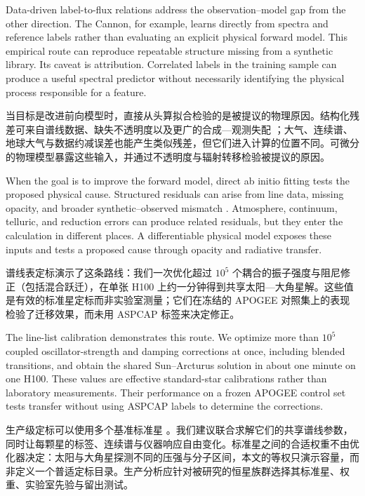 \begin{EN}
Data-driven label-to-flux relations address the observation--model gap from the
other direction. The Cannon, for example, learns directly from spectra and
reference labels rather than evaluating an explicit physical forward model.
This empirical route can reproduce repeatable structure missing from a
synthetic library. Its caveat is attribution. Correlated labels
in the training sample can produce a useful spectral predictor without
necessarily identifying the physical process responsible for a feature.
\end{EN}

当目标是改进前向模型时，直接从头算拟合检验的是被提议的物理原因。结构化残差可来自谱线数据、缺失不透明度以及更广的合成—观测失配 \citep{Czekala2015,OBriain2021}；大气、连续谱、地球大气与数据约减误差也能产生类似残差，但它们进入计算的位置不同。可微分的物理模型暴露这些输入，并通过不透明度与辐射转移检验被提议的原因。

\begin{EN}
When the goal is to improve the forward model, direct ab initio fitting tests
the proposed physical cause. Structured residuals can arise from line data,
missing opacity, and broader synthetic--observed mismatch
\citep{Czekala2015,OBriain2021}. Atmosphere, continuum, telluric, and reduction
errors can produce related residuals, but they enter the calculation in
different places. A
differentiable physical model exposes these inputs and tests a proposed cause
through opacity and radiative transfer.
\end{EN}

谱线表定标演示了这条路线：我们一次优化超过 $10^5$ 个耦合的振子强度与阻尼修正（包括混合跃迁），在单张 H100 上约一分钟得到共享太阳—大角星解。这些值是有效的标准星定标而非实验室测量；它们在冻结的 APOGEE 对照集上的表现检验了迁移效果，而未用 ASPCAP 标签来决定修正。

\begin{EN}
The line-list calibration demonstrates this route. We optimize more than
$10^5$ coupled oscillator-strength and damping corrections at once, including
blended transitions, and obtain the shared Sun--Arcturus solution in about one
minute on one H100. These values are effective standard-star calibrations rather
than laboratory measurements. Their performance on a frozen APOGEE control set
tests transfer without using ASPCAP labels to determine the corrections.
\end{EN}

生产级定标可以使用多个基准标准星 \citep{Heiter2015,Jofre2015,Smith2021}。我们建议联合求解它们的共享谱线参数，同时让每颗星的标签、连续谱与仪器响应自由变化。标准星之间的合适权重不由优化器决定：太阳与大角星探测不同的压强与分子区间，本文的等权只演示容量，而非定义一个普适定标目录。生产分析应针对被研究的恒星族群选择其标准星、权重、实验室先验与留出测试。


